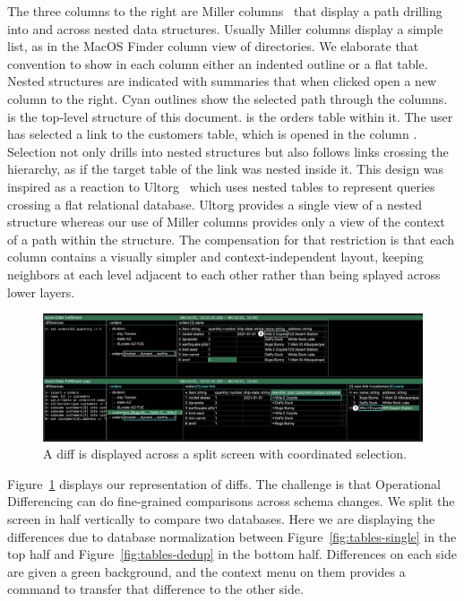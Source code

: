 \documentclass[english,submission]{programming}
\theoremstyle{definition}
\begin{document}
The three columns to the right are Miller columns~\cite{miller-columns} that display a path drilling into and across nested data structures. Usually Miller columns display a simple list, as in the MacOS Finder column view of directories. We elaborate that convention to show in each column either an indented outline or a flat table. Nested structures are indicated with summaries that when clicked open a new column to the right. Cyan outlines show the selected path through the columns.  is the top-level structure of this document.  is the \textsf{orders} table within it. The user has selected a link to the \textsf{customers} table, which is opened in the column . Selection not only drills into nested structures but also follows links crossing the hierarchy, as if the target table of the link was nested inside it. This design was inspired as a reaction to Ultorg~\cite{bakke:phdthesis, ultorg} which uses nested tables to represent queries crossing a flat relational database. Ultorg provides a single view of a nested structure whereas our use of Miller columns provides only a view of the context of a path within the structure. The compensation for that restriction is that each column contains a visually simpler and context-independent layout, keeping neighbors at each level adjacent to each other rather than being splayed across lower layers.

\begin{figure}[h]
\includegraphics[width=\textwidth]{DiffNumbered.png}
\caption{A diff is displayed across a split screen with coordinated selection.}
\label{fig:Diff}
\end{figure}

Figure~\ref{fig:Diff} displays our representation of diffs. The challenge is that Operational Differencing can do fine-grained comparisons across schema changes. We split the screen in half vertically to compare two databases. Here we are displaying the differences due to database normalization between Figure~\ref{fig:tables-single} in the top half and Figure~\ref{fig:tables-dedup} in the bottom half. Differences on each side are given a green background, and the context menu on them provides a command to transfer that difference to the other side.
\end{document}
